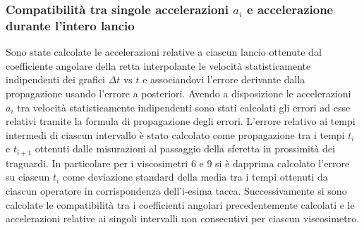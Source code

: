 \documentclass[a4paper,11pt,oneside]{article}
\begin{document}
\subsubsection*{Compatibilità tra singole accelerazioni $a_i$ e accelerazione durante l'intero lancio}
Sono state calcolate le accelerazioni relative a ciascun lancio ottenute dal coefficiente angolare della retta interpolante le velocità statisticamente indipendenti dei grafici $\Delta t$ vs $t$ e associandovi l'errore derivante dalla propagazione usando l'errore a posteriori.
Avendo a disposizione le accelerazioni $a_i$ tra velocità statisticamente indipendenti sono stati calcolati gli errori ad esse relativi tramite la formula di propagazione degli errori.
L'errore relativo ai tempi intermedi di ciascun intervallo è stato calcolato come propagazione tra i tempi $t_{i}$ e $t_{i+1}$ ottenuti dalle misurazioni al passaggio della sferetta in prossimità dei traguardi. In particolare per i viscosimetri 6 e 9 si è dapprima calcolato l'errore su ciascun $t_i$ come deviazione standard della media tra i tempi ottenuti da ciascun operatore in corrispondenza dell'i-esima tacca.
Successivamente si sono calcolate le compatibilità tra i coefficienti angolari precedentemente calcolati e le accelerazioni relative ai singoli intervalli non consecutivi per ciascun viscosimetro. 
\end{document}
